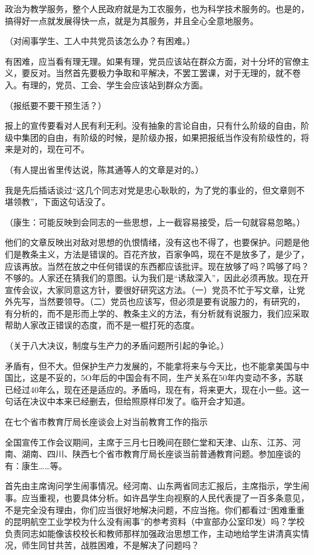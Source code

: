 政治为教学服务，整个人民政府就是为工农服务，也为科学技术服务的。也是的，搞得好一点就发展得快一点，就是为其服务，并且全心全意地服务。

（对闹事学生、工人中共党员该怎么办？有困难。）

有困难，应当看有理无理。如果有理，党员应该站在群众方面，对十分坏的官僚主义，要反对。当然首先要极力争取和平解决，不罢工罢课，对于无理的，就不卷入。有理的，党员、工会、学生会应该站到群众方面。

（报纸要不要干预生活？）

报上的宣传要看对人民有利无利。没有抽象的言论自由，只有什么阶级的自由，阶级中集团的自由，有阶级的时候，是阶级办报，如果把报纸当作没有阶级性的，将来是对的，现在可不。

（有人提出省里传达说，陈其通等人的文章是对的。）

我是先后插话谈过“这几个同志对党是忠心耿耿的，为了党的事业的，但文章则不堪领教”，下面这句话没了。

（康生：可能反映到会同志的一些思想，上一截容易接受，后一句就容易忽略。）

他们的文章反映出对敌对思想的仇恨情绪，没有这也不得了，也要保护。问题是他们是教条主义，方法是错误的。百花齐放，百家争鸣，现在不是放多了，是少了，应该再放。当然在放之中任何错误的东西都应该批评。现在放够了吗？鸣够了吗？不够的。人家还在猜我们的意图。认为我们是“诱敌深入”，因此必须再放。现在开宣传会议，大家同意这方针，要很好研究这方法。（一）党员不忙于写文章，让党外先写，当然要领导。（二）党员也应该写，但必须是要有说服力的，有研究的，有分析的，而不是形而上学的、教条主义的方法，有分析就有说服力，我们应采取帮助人家改正错误的态度，而不是一棍打死的态度。

（关于八大决议，制度与生产力的矛盾问题所引起的争论。）

矛盾有，但不大。但保护生产力发展的，不能拿将来与今天比，也不能拿美国与中国比，这是不妥的，5O年后的中国会有不同，生产关系在50年内变动不多，苏联已经过40年么，现在还是适应的。矛盾吗，现在有，将来更大，现在小一些。这一句话在决议中本来已经删去，但给照原样印发了。临开会才知道。

在七个省市教育厅局长座谈会上对当前教育工作的指示

全国宣传工作会议期间，主席于三月七日晚间在颐仁堂和天津、山东、江苏、河南、湖南、四川、陕西七个省市教育厅局长座谈当前普通教育问题。参加座谈的有：康生……等。

首先由主席询问学生闹事情况。经河南、山东两省同志汇报后，主席指示，学生闹事。应当重视，也要具体分析。如许昌学生向视察的人民代表提了一百多条意见，不是完全没有理由，你们应当很好地解决问题，不应当拖。你们都看过“困难重重的昆明航空工业学校为什么没有闹事”的参考资料（中宣部办公室印发）吗？学校负责同志如能像该校校长和教师那样加强政治思想工作，主动地给学生讲清真实情况，师生同甘共苦，战胜困难，不是解决了问题吗？

